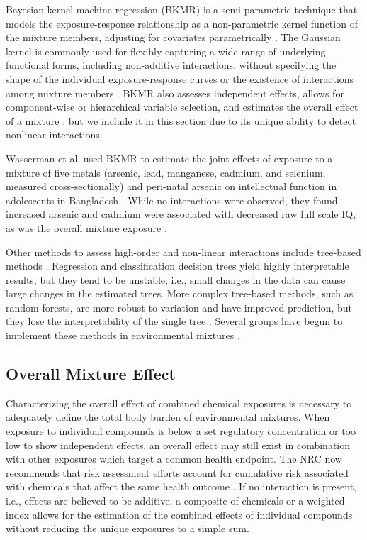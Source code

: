 Bayesian kernel machine regression (BKMR) is a semi-parametric technique that models the exposure-response relationship as a non-parametric kernel function of the mixture members, adjusting for covariates parametrically \citep{bobb2014bayesian, coull2015,bobb2018statistical}. The Gaussian kernel is commonly used for flexibly capturing a wide range of underlying functional forms, including non-additive interactions, without specifying the shape of the individual exposure-response curves or the existence of interactions among mixture members \citep{bobb2014bayesian, liu2007semiparametric}. BKMR also assesses independent effects, allows for component-wise or hierarchical variable selection, and estimates the overall effect of a mixture \citep{bobb2014bayesian, coull2015, bobb2018statistical}, but we include it in this section due to its unique ability to detect nonlinear interactions.

Wasserman et al. used BKMR to estimate the joint effects of exposure to a mixture of five metals (arsenic, lead, manganese, cadmium, and selenium, measured cross-sectionally) and peri-natal arsenic on intellectual function in adolescents in Bangladesh \citep{wasserman2018cross}. While no interactions were observed, they found increased arsenic and cadmium were associated with decreased raw full scale IQ, as was the overall mixture exposure \citep{wasserman2018cross}.

Other methods to assess high-order and non-linear interactions include tree-based methods \citep{friedman2001elements}. Regression and classification decision trees yield highly interpretable results, but they tend to be unstable, i.e., small changes in the data can cause large changes in the estimated trees. More complex tree-based methods, such as random forests, are more robust to variation and have improved prediction, but they lose the interpretability of the single tree \citep{ISLR}. Several groups have begun to implement these methods in environmental mixtures \citep{stingone2017using, ouidir2017atmospheric, gass2014classification}.

\subsection{Overall Mixture Effect}\label{sec:Overall}

Characterizing the overall effect of combined chemical exposures is necessary to adequately define the total body burden of environmental mixtures. When exposure to individual compounds is below a set regulatory concentration or too low to show independent effects, an overall effect may still exist in combination with other exposures which target a common health endpoint. The NRC now recommends that risk assessment efforts account for cumulative risk associated with chemicals that affect the same health outcome \citep{national2009phthalates, huang2018cumulative}. If no interaction is present, i.e., effects are believed to be additive, a composite of chemicals or a weighted index allows for the estimation of the combined effects of individual compounds without reducing the unique exposures to a simple sum. 

